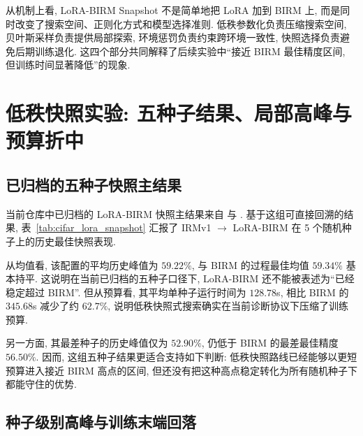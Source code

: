 \documentclass[a4paper,punct=banjiao,twoside]{ctexrep}
\theoremstyle{plain}
\theoremstyle{definition}
\theoremstyle{remark}
\begin{document}
从机制上看, LoRA-BIRM Snapshot 不是简单地把 LoRA 加到 BIRM 上, 而是同时改变了搜索空间、正则化方式和模型选择准则. 低秩参数化负责压缩搜索空间, 贝叶斯采样负责提供局部探索, 环境惩罚负责约束跨环境一致性, 快照选择负责避免后期训练退化. 这四个部分共同解释了后续实验中“接近 BIRM 最佳精度区间, 但训练时间显著降低”的现象.

\section{低秩快照实验: 五种子结果、局部高峰与预算折中}
\subsection{已归档的五种子快照主结果}

当前仓库中已归档的 LoRA-BIRM 快照主结果来自  与 . 基于这组可直接回溯的结果, 表~\ref{tab:cifar_lora_snapshot} 汇报了 IRMv1 $\rightarrow$ LoRA-BIRM 在 5 个随机种子上的历史最佳快照表现.

\begin{table}[htbp]
    \centering
    \caption{已归档的 IRMv1 $\rightarrow$ LoRA-BIRM 五种子快照主结果.}
    \label{tab:cifar_lora_snapshot}
\end{table}

从均值看, 该配置的平均历史峰值为 $59.22\%$, 与 BIRM 的过程最佳均值 $59.34\%$ 基本持平. 这说明在当前已归档的五种子口径下, LoRA-BIRM 还不能被表述为“已经稳定超过 BIRM”. 但从预算看, 其平均单种子运行时间为 $128.78$s, 相比 BIRM 的 $345.68$s 减少了约 $62.7\%$, 说明低秩快照式搜索确实在当前诊断协议下压缩了训练预算.

另一方面, 其最差种子的历史峰值仅为 $52.90\%$, 仍低于 BIRM 的最差最佳精度 $56.50\%$. 因而, 这组五种子结果更适合支持如下判断: 低秩快照路线已经能够以更短预算进入接近 BIRM 高点的区间, 但还没有把这种高点稳定转化为所有随机种子下都能守住的优势.

\subsection{种子级别高峰与训练末端回落}
\end{document}
